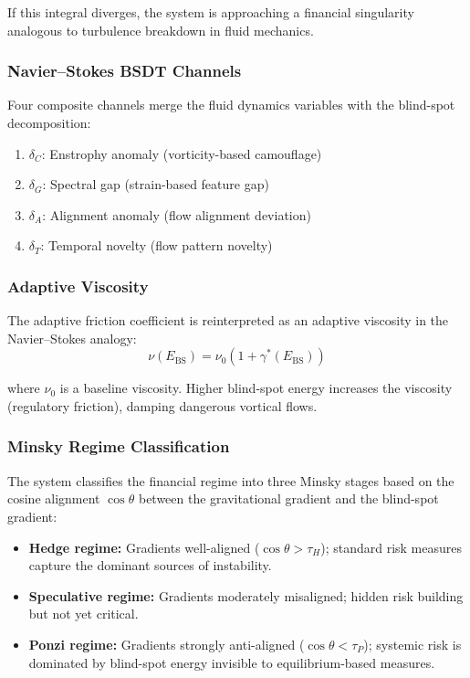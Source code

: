 \documentclass[12pt,a4paper]{article}
\begin{document}
If this integral diverges, the system is approaching a financial 
singularity analogous to turbulence breakdown in fluid mechanics.

\subsubsection{Navier--Stokes BSDT Channels}

Four composite channels merge the fluid dynamics variables with the 
blind-spot decomposition:
\begin{enumerate}
\item $\delta_C$: Enstrophy anomaly (vorticity-based camouflage)
\item $\delta_G$: Spectral gap (strain-based feature gap)
\item $\delta_A$: Alignment anomaly (flow alignment deviation)
\item $\delta_T$: Temporal novelty (flow pattern novelty)
\end{enumerate}

\subsubsection{Adaptive Viscosity}

The adaptive friction coefficient is reinterpreted as an adaptive viscosity 
in the Navier--Stokes analogy:
\begin{equation}
\nu(E_{\text{BS}}) = \nu_0\left(1 + \gamma^*(E_{\text{BS}})\right)
\end{equation}

where $\nu_0$ is a baseline viscosity. Higher blind-spot energy increases 
the viscosity (regulatory friction), damping dangerous vortical flows.

\subsubsection{Minsky Regime Classification}

The system classifies the financial regime into three Minsky stages based 
on the cosine alignment $\cos\theta$ between the gravitational gradient 
and the blind-spot gradient:
\begin{itemize}
\item \textbf{Hedge regime:} Gradients well-aligned ($\cos\theta > 
\tau_H$); standard risk measures capture the dominant sources of 
instability.
\item \textbf{Speculative regime:} Gradients moderately misaligned; hidden 
risk building but not yet critical.
\item \textbf{Ponzi regime:} Gradients strongly anti-aligned ($\cos\theta 
< \tau_P$); systemic risk is dominated by blind-spot energy invisible to 
equilibrium-based measures.
\end{itemize}
\end{document}
